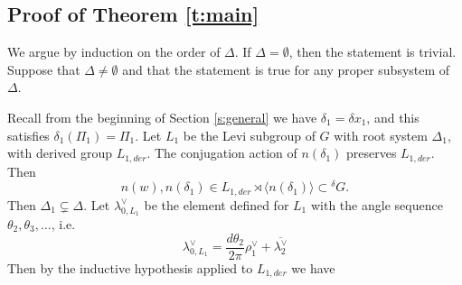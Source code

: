 \documentclass[10pt,leqno]{article}
\newcommand{\ch}[1]{#1^\vee}
\def\d{\delta}
\begin{document}
\subsection{Proof of Theorem \ref{t:main}}
We argue by induction on the order of $\Delta$.  If
$\Delta=\emptyset$, then the statement is trivial.  Suppose that
$\Delta \neq \emptyset$ and that the statement is true for
any proper subsystem of $\Delta$.

Recall from the beginning of Section \ref{s:general} we have
$\delta_1=\delta x_1$, and this satisfies $\delta_1(\Pi_1)=\Pi_1$. Let
$L_1$ be the Levi subgroup of $G$ with root system $\Delta_1$, with derived group $L_{1,der}$.
The conjugation action of
$n(\d_1)$ preserves $L_{1,der}$. Then
$$
n(w),n(\delta_1) \in L_{1,der}\rtimes\langle n(\d_1)\rangle \subset {}^{\delta} G.
$$
Then $\Delta_1\subsetneq \Delta$.
Let $\ch\lambda_{0,L_1}$ be the element defined for $L_1$ with the angle sequence $\theta_2,\theta_3,\dots$,
i.e.
\begin{equation}
\label{e:lambda0L1}
\ch\lambda_{0,L_1}=\frac{d\theta_2}{2\pi}\ch\rho_1+\overline{\ch\lambda_2}
\end{equation}
Then by the inductive hypothesis
applied to $L_{1, der}$ we have
\end{document}
